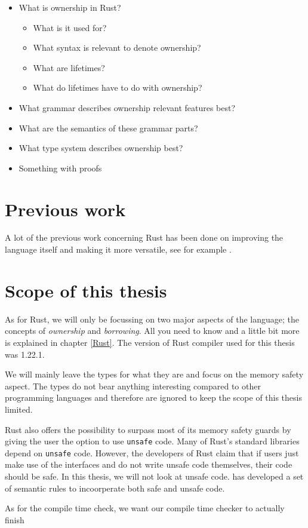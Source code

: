 \begin{itemize}[noitemsep]
    \item What is ownership in Rust?
    \begin{itemize}[noitemsep]
        \item What is it used for?
        \item What syntax is relevant to denote ownership?
        \item What are lifetimes?
        \item What do lifetimes have to do with ownership?
    \end{itemize}
    \item What grammar describes ownership relevant features best?
    \item What are the semantics of these grammar parts?
    \item What type system describes ownership best?
    \item Something with proofs
\end{itemize}




\section{Previous work}
A lot of the previous work concerning Rust has been done on improving the language itself and making it more versatile, see for example \cite{jespersen2015session}.


\section{Scope of this thesis}
As for Rust, we will only be focussing on two major aspects of the language; the concepts of \emph{ownership} and \emph{borrowing}. All you need to know and a little bit more is explained in chapter \ref{Rust}. The version of Rust compiler used for this thesis was 1.22.1. 

We will mainly leave the types for what they are and focus on the memory safety aspect. The types do not bear anything interesting compared to other programming languages and therefore are ignored to keep the scope of this thesis limited. 

Rust also offers the possibility to surpass most of its memory safety guards by giving the user the option to use \texttt{unsafe} code. Many of Rust's standard libraries depend on \texttt{unsafe} code. However, the developers of Rust claim that if users just make use of the interfaces and do not write unsafe code themselves, their code should be safe. In this thesis, we will not look at unsafe code. \cite{jung2017rustbelt} has developed a set of semantic rules to incoorperate both safe and unsafe code. 

As for the compile time check, we want our compile time checker to actually finish 

